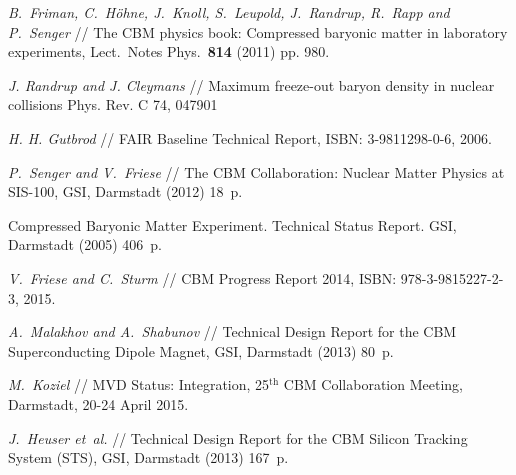 \begin{thebibliography}{99}


\textit{B.~Friman, C.~H\"{o}hne, J.~Knoll, S.~Leupold, J.~Randrup, R.~Rapp and P.~Senger} //
The CBM physics book: Compressed baryonic matter in laboratory experiments,
Lect.\ Notes Phys.\ {\bf 814} (2011) pp. 980.

\textit{J. Randrup and J. Cleymans} //
Maximum freeze-out baryon density in nuclear collisions
Phys. Rev. C 74, 047901



\textit{H. H. Gutbrod} // %
FAIR Baseline Technical Report,
ISBN: 3-9811298-0-6, 2006.


\textit{P.~Senger and V.~Friese} //
The CBM Collaboration: Nuclear Matter Physics at SIS-100,
GSI, Darmstadt (2012) 18~p.

Compressed Baryonic Matter Experiment. Technical Status Report.
GSI, Darmstadt (2005) 406~p.

\textit{V.~Friese and C.~Sturm} // %
CBM Progress Report 2014,
ISBN: 978-3-9815227-2-3, 2015.


\textit{A.~Malakhov and A.~Shabunov} // %
Technical Design Report for the CBM Superconducting Dipole Magnet,
GSI, Darmstadt (2013) 80~p.

\textit{M.~Koziel} //
MVD Status: Integration,
25$^\mathrm{th}$ CBM Collaboration Meeting, Darmstadt, 20-24 April 2015.

\textit{J.~Heuser et~al.} //
Technical Design Report for the CBM Silicon Tracking System (STS),
 GSI, Darmstadt (2013) 167~p.


\end{thebibliography}
